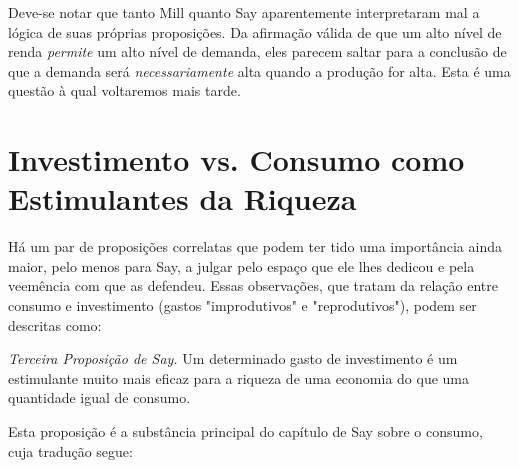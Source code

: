 \documentclass[12pt]{article}
\begin{document}
Deve-se notar que tanto Mill quanto Say aparentemente interpretaram mal a lógica de suas próprias proposições. Da afirmação válida de que um alto nível de renda \textit{permite} um alto nível de demanda, eles parecem saltar para a conclusão de que a demanda será \textit{necessariamente} alta quando a produção for alta. Esta é uma questão à qual voltaremos mais tarde.

\section{Investimento vs. Consumo como Estimulantes da Riqueza}

Há um par de proposições correlatas que podem ter tido uma importância ainda maior, pelo menos para Say, a julgar pelo espaço que ele lhes dedicou e pela veemência com que as defendeu. Essas observações, que tratam da relação entre consumo e investimento (gastos "improdutivos" e "reprodutivos"), podem ser descritas como:

\textit{Terceira Proposição de Say.} Um determinado gasto de investimento é um estimulante muito mais eficaz para a riqueza de uma economia do que uma quantidade igual de consumo.

Esta proposição é a substância principal do capítulo de Say sobre o consumo, cuja tradução segue:
\end{document}
